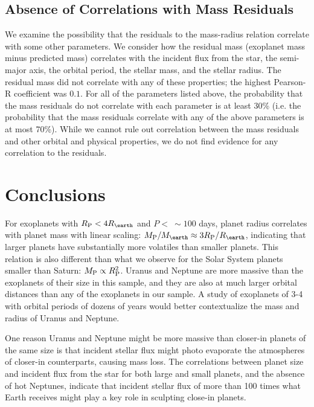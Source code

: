 \documentclass[11pt]{aastex}
\newcommand{\rspecial}{4 \rearth}
\begin{document}
\subsection{Absence of Correlations with Mass Residuals}
We examine the possibility that the residuals to the mass-radius relation correlate with some other parameters.  We consider how the residual mass (exoplanet mass minus predicted mass) correlates with the incident flux from the star, the semi-major axis, the orbital period, the stellar mass, and the stellar radius.  The residual mass did not correlate with any of these properties; the highest Pearson-R coefficient was $0.1$.  For all of the parameters listed above, the probability that the mass residuals do not correlate with each parameter is at least 30\% (i.e. the probability that the mass residuals correlate with any of the above parameters is at most 70\%).  While we cannot rule out correlation between the mass residuals and other orbital and physical properties, we do not find evidence for any correlation to the residuals.

\section{Conclusions}
For exoplanets with $\rpl < \rspecial$ and $P < ~\sim100$ days, planet radius correlates with planet mass with linear scaling: $\mpl/\mearth \approx 3\rpl/\rearth$, indicating that larger planets have substantially more volatiles than smaller planets.  This relation is also different than what we observe for the Solar System planets smaller than Saturn: $M_{\rm P} \propto R_{\rm P}^2$.  Uranus and Neptune are more massive than the exoplanets of their size in this sample, and they are also at much larger orbital distances than any of the exoplanets in our sample.  A study of exoplanets of 3-4 \rearth with orbital periods of dozens of years would better contextualize the mass and radius of Uranus and Neptune.

One reason Uranus and Neptune might be more massive than closer-in planets of the same size is that incident stellar flux might photo evaporate the atmospheres of closer-in counterparts, causing mass loss.  The correlations between planet size and incident flux from the star for both large and small planets, and the absence of hot Neptunes, indicate that incident stellar flux of more than 100 times what Earth receives might play a key role in sculpting close-in planets.
\end{document}
